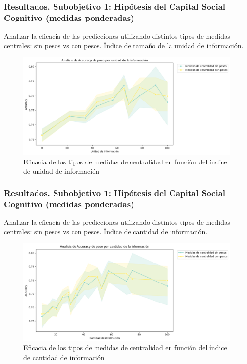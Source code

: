 \documentclass{beamer}
\begin{document}
\begin{frame}
	\frametitle{Resultados. Subobjetivo 1: Hipótesis del Capital Social Cognitivo (medidas ponderadas)}
	\begin{block}{Analizar la eficacia de las predicciones utilizando
		distintos tipos de medidas centrales: sin pesos vs con pesos.}
		Índice de tamaño de la unidad de información.
	\end{block}
	
\begin{figure}[H]
	\centering
	\includegraphics[width=0.6\linewidth]{figs/cap7/figura_35}
	\caption{Eficacia de los tipos de medidas de centralidad en función del índice de unidad de información}
	
	\label{fig:figura219}
\end{figure}

	
	
\end{frame}


\begin{frame}
	\frametitle{Resultados. Subobjetivo 1: Hipótesis del Capital Social Cognitivo (medidas ponderadas)}
	\begin{block}{Analizar la eficacia de las predicciones utilizando
		distintos tipos de medidas centrales: sin pesos vs con pesos.}
		Índice de cantidad de información.
	\end{block}
	

\begin{figure}[H]
	\centering
	\includegraphics[width=0.6\linewidth]{figs/cap7/figura_36}
	\caption{Eficacia de los tipos de medidas de centralidad en función del índice de cantidad de información}
	\label{fig:figura220}
\end{figure}
	
\end{frame}
\end{document}

